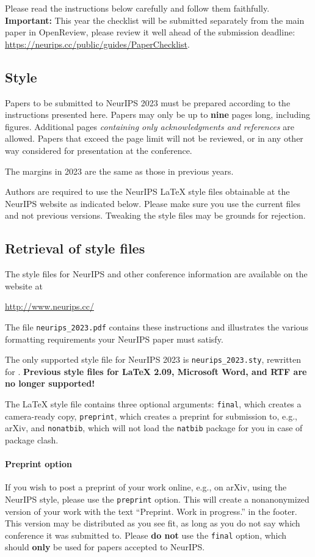 \documentclass{article}
\begin{document}
\begin{CJK}{UTF8}{gbsn}
Please read the instructions below carefully and follow them faithfully. \textbf{Important:} This year the checklist will be submitted separately from the main paper in OpenReview, please review it well ahead of the submission deadline: \url{https://neurips.cc/public/guides/PaperChecklist}.


\subsection{Style}


Papers to be submitted to NeurIPS 2023 must be prepared according to the
instructions presented here. Papers may only be up to {\bf nine} pages long,
including figures. Additional pages \emph{containing only acknowledgments and
references} are allowed. Papers that exceed the page limit will not be
reviewed, or in any other way considered for presentation at the conference.


The margins in 2023 are the same as those in previous years.


Authors are required to use the NeurIPS \LaTeX{} style files obtainable at the
NeurIPS website as indicated below. Please make sure you use the current files
and not previous versions. Tweaking the style files may be grounds for
rejection.


\subsection{Retrieval of style files}


The style files for NeurIPS and other conference information are available on
the website at
\begin{center}
  \url{http://www.neurips.cc/}
\end{center}
The file \verb+neurips_2023.pdf+ contains these instructions and illustrates the
various formatting requirements your NeurIPS paper must satisfy.


The only supported style file for NeurIPS 2023 is \verb+neurips_2023.sty+,
rewritten for \LaTeXe{}.  \textbf{Previous style files for \LaTeX{} 2.09,
  Microsoft Word, and RTF are no longer supported!}


The \LaTeX{} style file contains three optional arguments: \verb+final+, which
creates a camera-ready copy, \verb+preprint+, which creates a preprint for
submission to, e.g., arXiv, and \verb+nonatbib+, which will not load the
\verb+natbib+ package for you in case of package clash.


\paragraph{Preprint option}
If you wish to post a preprint of your work online, e.g., on arXiv, using the
NeurIPS style, please use the \verb+preprint+ option. This will create a
nonanonymized version of your work with the text ``Preprint. Work in progress.''
in the footer. This version may be distributed as you see fit, as long as you do not say which conference it was submitted to. Please \textbf{do
  not} use the \verb+final+ option, which should \textbf{only} be used for
papers accepted to NeurIPS. 



\end{CJK}
\end{document}
